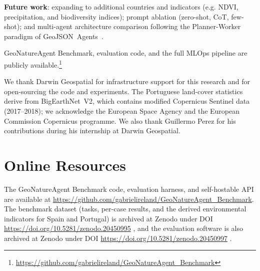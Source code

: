 \documentclass[sigconf]{acmart}
\begin{document}
\noindent\textbf{Future work}: expanding to additional countries and indicators (e.g. NDVI, precipitation, and biodiversity indices); prompt ablation (zero-shot, CoT, few-shot); and multi-agent architecture comparison following the Planner-Worker paradigm of GeoJSON~Agents~\citep{luo2025geojsonagents}.

GeoNatureAgent Benchmark, evaluation code, and the full MLOps pipeline are publicly available.\footnote{\url{https://github.com/gabrielireland/GeoNatureAgent_Benchmark}}


\begin{acks}
We thank Darwin Geospatial for infrastructure support for this research and for open-sourcing the code and experiments. The Portuguese land-cover statistics derive from BigEarthNet~V2, which contains modified Copernicus Sentinel data (2017--2018); we acknowledge the European Space Agency and the European Commission Copernicus programme. We also thank Guillermo Perez for his contributions during his internship at Darwin Geospatial.
\end{acks}





\appendix


\section{Online Resources}
\label{sec:Data_Availability}

The GeoNatureAgent Benchmark code, evaluation harness, and self-hostable API are available at \url{https://github.com/gabrielireland/GeoNatureAgent_Benchmark}. The benchmark dataset (tasks, per-case results, and the derived environmental indicators for Spain and Portugal) is archived at Zenodo under DOI \url{https://doi.org/10.5281/zenodo.20450995} \citep{geonatureagent_dataset}, and the evaluation software is also archived at Zenodo under DOI \url{https://doi.org/10.5281/zenodo.20450997} \citep{geonatureagent_software}.
\end{document}
